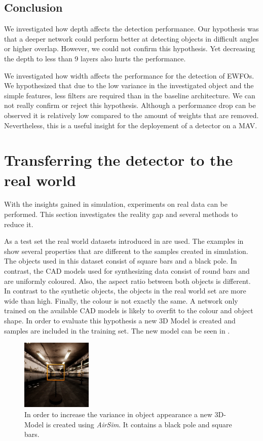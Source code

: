 \subsection{Conclusion}

We investigated how depth affects the detection performance. Our hypothesis was that a deeper network could perform better at detecting objects in difficult angles or higher overlap. However, we could not confirm this hypothesis. Yet decreasing the depth to less than 9 layers also hurts the performance. 

We investigated how width affects the performance for the detection of \acp{EWFO}. We hypothesized that due to the low variance in the investigated object and the simple features, less filters are required than in the baseline architecture. We can not really confirm or reject this hypothesis. Although a performance drop can be observed it is relatively low compared to the amount of weights that are removed. Nevertheless, this is a useful insight for the deployement of a detector on a \ac{MAV}.


\section{Transferring the detector to the real world}

With the insights gained in simulation, experiments on real data can be performed. This section investigates the reality gap and several methods to reduce it.

As a test set the real world datasets introduced in  are used. The examples in  show several properties that are different to the samples created in simulation. The objects used in this dataset consist of square bars and a black pole. In contrast, the \ac{CAD} models used for synthesizing data consist of round bars and are uniformly coloured. Also, the aspect ratio between both objects is different. In contrast to the synthetic objects, the objects in the real world set are more wide than high. Finally, the colour is not exactly the same. A network only trained on the available \ac{CAD} models is likely to overfit to the colour and object shape. In order to evaluate this hypothesis a new 3D Model is created and samples are included in the training set. The new model can be seen in .

\begin{figure}[hbtp]
	\centering
	\includegraphics[width=0.3\textwidth]{fig/mavlabexample}
	\caption{In order to increase the variance in object appearance a new 3D-Model is created using \textit{AirSim}. It contains a black pole and square bars.}
	\label{fig:mavlabgateexample}
\end{figure}


